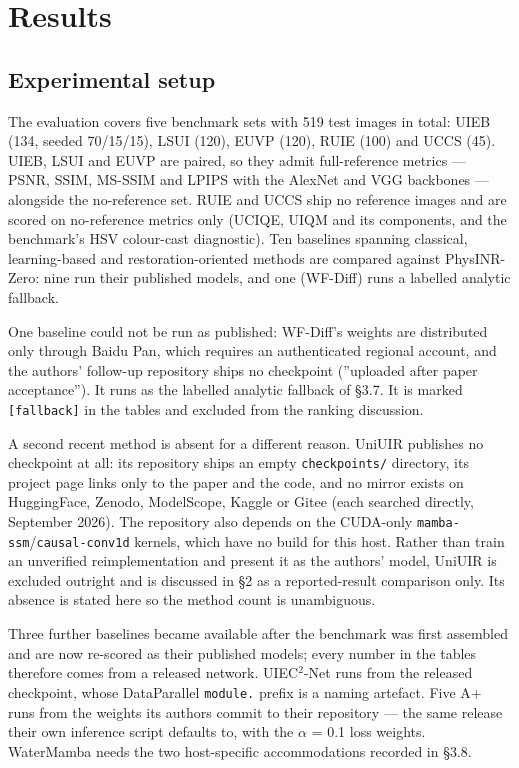 \documentclass[journal]{IEEEtran}
\begin{document}
\section{Results}
\subsection{Experimental setup}
The evaluation covers five benchmark sets with 519 test images in total: UIEB (134, seeded 70/15/15), LSUI (120), EUVP (120), RUIE (100) and UCCS (45). UIEB, LSUI and EUVP are paired, so they admit full-reference metrics --- PSNR, SSIM, MS-SSIM and LPIPS with the AlexNet and VGG backbones --- alongside the no-reference set. RUIE and UCCS ship no reference images and are scored on no-reference metrics only (UCIQE, UIQM and its components, and the benchmark's HSV colour-cast diagnostic). Ten baselines spanning classical, learning-based and restoration-oriented methods are compared against PhysINR-Zero: nine run their published models, and one (WF-Diff) runs a labelled analytic fallback.

One baseline could not be run as published: WF-Diff's weights are distributed only through Baidu Pan, which requires an authenticated regional account, and the authors' follow-up repository ships no checkpoint (''uploaded after paper acceptance''). It runs as the labelled analytic fallback of \S{}3.7. It is marked \texttt{[fallback]} in the tables and excluded from the ranking discussion.

A second recent method is absent for a different reason. UniUIR \cite{zhang2025uniuir} publishes no checkpoint at all: its repository ships an empty \texttt{checkpoints/} directory, its project page links only to the paper and the code, and no mirror exists on HuggingFace, Zenodo, ModelScope, Kaggle or Gitee (each searched directly, September 2026). The repository also depends on the CUDA-only \texttt{mamba-ssm}/\texttt{causal-conv1d} kernels, which have no build for this host. Rather than train an unverified reimplementation and present it as the authors' model, UniUIR is excluded outright and is discussed in \S{}2 as a reported-result comparison only. Its absence is stated here so the method count is unambiguous.

Three further baselines became available after the benchmark was first assembled and are now re-scored as their published models; every number in the tables therefore comes from a released network. UIEC$^{2}$-Net runs from the released checkpoint, whose DataParallel \texttt{module.} prefix is a naming artefact. Five A+ runs from the weights its authors commit to their repository --- the same release their own inference script defaults to, with the $\alpha$ = 0.1 loss weights. WaterMamba needs the two host-specific accommodations recorded in \S{}3.8.
\end{document}
